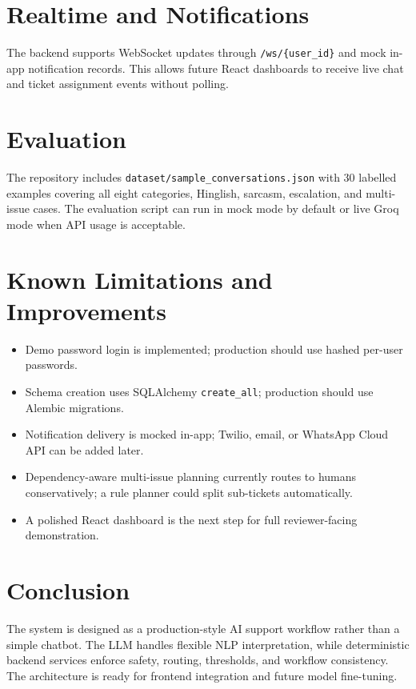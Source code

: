 ﻿\documentclass[11pt,a4paper]{article}
\begin{document}
\section{Realtime and Notifications}
The backend supports WebSocket updates through \texttt{/ws/\{user\_id\}} and mock in-app notification records. This allows future React dashboards to receive live chat and ticket assignment events without polling.

\section{Evaluation}
The repository includes \texttt{dataset/sample\_conversations.json} with 30 labelled examples covering all eight categories, Hinglish, sarcasm, escalation, and multi-issue cases. The evaluation script can run in mock mode by default or live Groq mode when API usage is acceptable.

\section{Known Limitations and Improvements}
\begin{itemize}
  \item Demo password login is implemented; production should use hashed per-user passwords.
  \item Schema creation uses SQLAlchemy \texttt{create\_all}; production should use Alembic migrations.
  \item Notification delivery is mocked in-app; Twilio, email, or WhatsApp Cloud API can be added later.
  \item Dependency-aware multi-issue planning currently routes to humans conservatively; a rule planner could split sub-tickets automatically.
  \item A polished React dashboard is the next step for full reviewer-facing demonstration.
\end{itemize}

\section{Conclusion}
The system is designed as a production-style AI support workflow rather than a simple chatbot. The LLM handles flexible NLP interpretation, while deterministic backend services enforce safety, routing, thresholds, and workflow consistency. The architecture is ready for frontend integration and future model fine-tuning.
\end{document}
